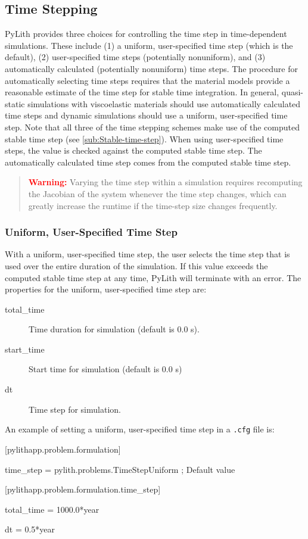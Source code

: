 \subsection{\label{sub:Time-Stepping}Time Stepping}

PyLith provides three choices for controlling the time step in time-dependent
simulations. These include (1) a uniform, user-specified time step
(which is the default), (2) user-specified time steps (potentially
nonuniform), and (3) automatically calculated (potentially nonuniform)
time steps. The procedure for automatically selecting time steps requires
that the material models provide a reasonable estimate of the time
step for stable time integration. In general, quasi-static simulations
with viscoelastic materials should use automatically calculated time
steps and dynamic simulations should use a uniform, user-specified
time step. Note that all three of the time stepping schemes make use
of the computed stable time step (see \vref{sub:Stable-time-step}).
When using user-specified time steps, the value is checked against
the computed stable time step. The automatically calculated time step
comes from the computed stable time step.
\begin{quote}
\textbf{\textcolor{red}{Warning:}} Varying the time step within a
simulation requires recomputing the Jacobian of the system whenever
the time step changes, which can greatly increase the runtime if the
time-step size changes frequently.
\end{quote}

\subsubsection{Uniform, User-Specified Time Step}

With a uniform, user-specified time step, the user selects the time
step that is used over the entire duration of the simulation. If this
value exceeds the computed stable time step at any time, PyLith will
terminate with an error. The properties for the uniform, user-specified
time step are:
\begin{description}
\item [{total\_time}] Time duration for simulation (default is 0.0 s).
\item [{start\_time}] Start time for simulation (default is 0.0 s)
\item [{dt}] Time step for simulation.
\end{description}
An example of setting a uniform, user-specified time step in a \texttt{.cfg}
file is:
\begin{lyxcode}
{[}pylithapp.problem.formulation{]}

time\_step = pylith.problems.TimeStepUniform ; Default value



{[}pylithapp.problem.formulation.time\_step{]}

total\_time = 1000.0{*}year

dt = 0.5{*}year
\end{lyxcode}

